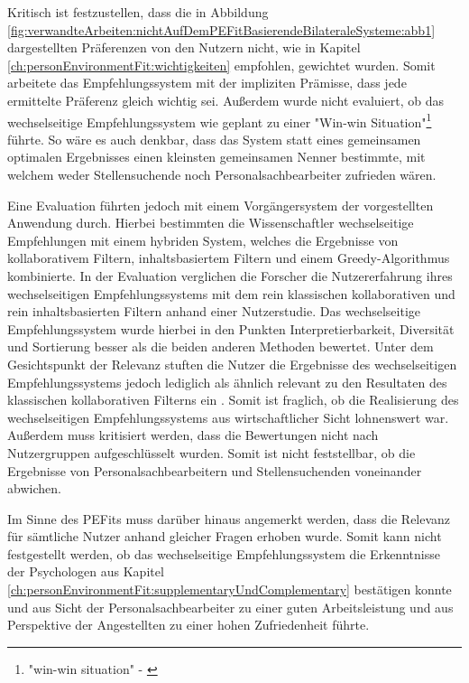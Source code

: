 Kritisch ist festzustellen, dass die in Abbildung \ref{fig:verwandteArbeiten:nichtAufDemPEFitBasierendeBilateraleSysteme:abb1} dargestellten Präferenzen von den Nutzern nicht, wie in Kapitel \ref{ch:personEnvironmentFit:wichtigkeiten} empfohlen, gewichtet wurden. Somit arbeitete das Empfehlungssystem mit der impliziten Prämisse, dass jede ermittelte Präferenz gleich wichtig sei. Außerdem wurde nicht evaluiert, ob das wechselseitige Empfehlungssystem wie geplant zu einer "Win-win Situation"\footnote{"win-win situation" - \textcite[S. 3, Z. 45f.]{wenxing:2015}} \cite[S. 3, Z. 45f.]{wenxing:2015} führte. So wäre es auch denkbar, dass das System statt eines gemeinsamen optimalen Ergebnisses einen kleinsten gemeinsamen Nenner bestimmte, mit welchem weder Stellensuchende noch Personalsachbearbeiter zufrieden wären.

Eine Evaluation führten jedoch \textcite[S. 1ff.]{hong:2013b} mit einem Vorgängersystem der vorgestellten Anwendung durch. Hierbei bestimmten die Wissenschaftler wechselseitige Empfehlungen mit einem hybriden System, welches die Ergebnisse von kollaborativem Filtern, inhaltsbasiertem Filtern und einem Greedy-Algorithmus kombinierte. In der Evaluation verglichen die Forscher die Nutzererfahrung ihres wechselseitigen Empfehlungssystems mit dem rein klassischen kollaborativen und rein inhaltsbasierten Filtern anhand einer Nutzerstudie. Das wechselseitige Empfehlungssystem wurde hierbei in den Punkten Interpretierbarkeit, Diversität und Sortierung besser als die beiden anderen Methoden bewertet. Unter dem Gesichtspunkt der Relevanz stuften die Nutzer die Ergebnisse des wechselseitigen Empfehlungssystems jedoch lediglich als ähnlich relevant zu den Resultaten des klassischen kollaborativen Filterns ein \cite[S. 1ff.]{hong:2013b}. Somit ist fraglich, ob die Realisierung des wechselseitigen Empfehlungssystems aus wirtschaftlicher Sicht lohnenswert war. Außerdem muss kritisiert werden, dass die Bewertungen nicht nach Nutzergruppen aufgeschlüsselt wurden. Somit ist nicht feststellbar, ob die Ergebnisse von Personalsachbearbeitern und Stellensuchenden voneinander abwichen.

Im Sinne des \acp{PEFit} muss darüber hinaus angemerkt werden, dass die Relevanz für sämtliche Nutzer anhand gleicher Fragen erhoben wurde. Somit kann nicht festgestellt werden, ob das wechselseitige Empfehlungssystem die Erkenntnisse der Psychologen aus Kapitel \ref{ch:personEnvironmentFit:supplementaryUndComplementary} bestätigen konnte und aus Sicht der Personalsachbearbeiter zu einer guten Arbeitsleistung und aus Perspektive der Angestellten zu einer hohen Zufriedenheit führte.
\newpage
